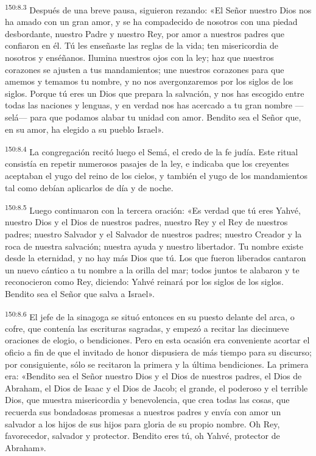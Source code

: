 \par 
\textsuperscript{150:8.3} Después de una breve pausa, siguieron rezando: «El Señor nuestro Dios nos ha amado con un gran amor, y se ha compadecido de nosotros con una piedad desbordante, nuestro Padre y nuestro Rey, por amor a nuestros padres que confiaron en él. Tú les enseñaste las reglas de la vida; ten misericordia de nosotros y enséñanos. Ilumina nuestros ojos con la ley; haz que nuestros corazones se ajusten a tus mandamientos; une nuestros corazones para que amemos y temamos tu nombre, y no nos avergonzaremos por los siglos de los siglos. Porque tú eres un Dios que prepara la salvación, y nos has escogido entre todas las naciones y lenguas, y en verdad nos has acercado a tu gran nombre ---selá--- para que podamos alabar tu unidad con amor. Bendito sea el Señor que, en su amor, ha elegido a su pueblo Israel».

\par 
\textsuperscript{150:8.4} La congregación recitó luego el Semá, el credo de la fe judía. Este ritual consistía en repetir numerosos pasajes de la ley, e indicaba que los creyentes aceptaban el yugo del reino de los cielos, y también el yugo de los mandamientos tal como debían aplicarlos de día y de noche.

\par 
\textsuperscript{150:8.5} Luego continuaron con la tercera oración: «Es verdad que tú eres Yahvé, nuestro Dios y el Dios de nuestros padres, nuestro Rey y el Rey de nuestros padres; nuestro Salvador y el Salvador de nuestros padres; nuestro Creador y la roca de nuestra salvación; nuestra ayuda y nuestro libertador. Tu nombre existe desde la eternidad, y no hay más Dios que tú. Los que fueron liberados cantaron un nuevo cántico a tu nombre a la orilla del mar; todos juntos te alabaron y te reconocieron como Rey, diciendo: Yahvé reinará por los siglos de los siglos. Bendito sea el Señor que salva a Israel».

\par 
\textsuperscript{150:8.6} El jefe de la sinagoga se situó entonces en su puesto delante del arca, o cofre, que contenía las escrituras sagradas, y empezó a recitar las diecinueve oraciones de elogio, o bendiciones. Pero en esta ocasión era conveniente acortar el oficio a fin de que el invitado de honor dispusiera de más tiempo para su discurso; por consiguiente, sólo se recitaron la primera y la última bendiciones. La primera era: «Bendito sea el Señor nuestro Dios y el Dios de nuestros padres, el Dios de Abraham, el Dios de Isaac y el Dios de Jacob; el grande, el poderoso y el terrible Dios, que muestra misericordia y benevolencia, que crea todas las cosas, que recuerda sus bondadosas promesas a nuestros padres y envía con amor un salvador a los hijos de sus hijos para gloria de su propio nombre. Oh Rey, favorecedor, salvador y protector. Bendito eres tú, oh Yahvé, protector de Abraham».

